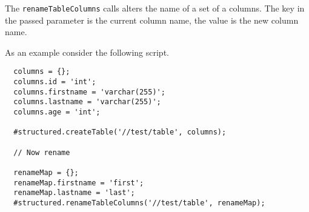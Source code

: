 The \verb+renameTableColumns+ calls alters the name of a set of a columns. The key in the passed parameter is the
current column name, the value is the new column name.

As an example consider the following \Reflex script.

\begin{Verbatim}
  columns = {};
  columns.id = 'int';
  columns.firstname = 'varchar(255)';
  columns.lastname = 'varchar(255)';
  columns.age = 'int';

  #structured.createTable('//test/table', columns);

  // Now rename

  renameMap = {};
  renameMap.firstname = 'first';
  renameMap.lastname = 'last';
  #structured.renameTableColumns('//test/table', renameMap);

\end{Verbatim}
